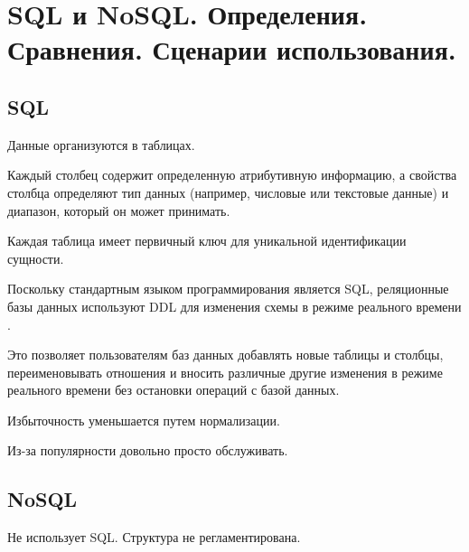 \section{SQL и NoSQL. Определения. Сравнения. Сценарии использования.}


\subsection*{SQL}


Данные организуются в таблицах.

Каждый столбец содержит определенную атрибутивную информацию, а
свойства столбца определяют тип данных (например, числовые или текстовые
данные) и диапазон, который он может принимать.

Каждая таблица имеет первичный ключ для уникальной идентификации сущности.

Поскольку стандартным языком программирования является SQL, реляционные базы данных
используют DDL для изменения схемы в режиме реального времени .

Это позволяет пользователям баз данных добавлять новые таблицы и столбцы,
переименовывать отношения и вносить различные другие изменения в режиме реального времени без
остановки операций с базой данных.

Избыточность уменьшается путем нормализации.

Из-за популярности довольно просто обслуживать.


\subsection*{NoSQL}


Не использует SQL. Структура не регламентирована.

